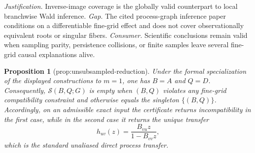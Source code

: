 \documentclass{article}
\newtheorem{proposition}{Proposition}
\begin{document}
\par\smallskip\noindent \textit{Justification.} Inverse-image coverage is the globally valid counterpart to local branchwise Wald inference. \textit{Gap.} The cited process-graph inference paper conditions on a differentiable fine-grid effect and does not cover observationally equivalent roots or singular fibers. \textit{Consumer.} Scientific conclusions remain valid when sampling parity, persistence collisions, or finite samples leave several fine-grid causal explanations alive.

\begin{proposition}[prop:unsubsampled-reduction]\label{prop:unsubsampled-reduction}
Under the formal specialization of the displayed constructions to \(m=1\), one has \(B=A\) and \(Q=D\). Consequently, \(\mathcal S(B,Q;G)\) is empty when \((B,Q)\) violates any fine-grid compatibility constraint and otherwise equals the singleton \(\{(B,Q)\}\). Accordingly, on an admissible exact input the certificate returns incompatibility in the first case, while in the second case it returns the unique transfer
\[
h_{uv}(z)=\frac{B_{vu}z}{1-B_{vv}z},
\]
which is the standard unaliased direct process transfer.
\end{proposition}
\end{document}

